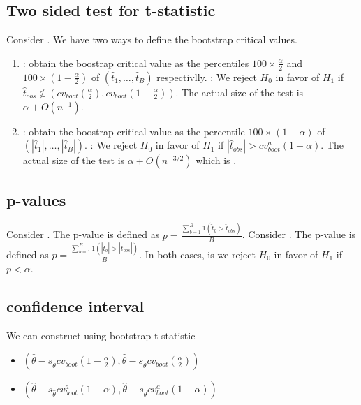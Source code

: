 \subsection{Two sided test for t-statistic}

Consider . We have two ways to define the bootstrap critical values.
\begin{enumerate}
    \item {}: obtain the boostrap critical value  as the percentiles
    $100 \times \frac{\alpha}{2}$ and $100\times(1-\frac{\alpha}{2})$ of $(\hat{t}_1,\ldots,\hat{t}_B)$ respectivlly. 
    : We reject $H_0$ in favor of $H_1$ if $\hat{t}_{obs}\notin (cv_{boot}(\frac{\alpha}{2}),cv_{boot}(1-\frac{\alpha}{2}))$.
    The actual size of the test is $\alpha+O(n^{-1})$. 
    \item {}: obtain the boostrap critical value  as the percentile $100 \times (1-\alpha)$ of $(|\hat{t}_1|,\ldots,|\hat{t}_B|)$.
    : We reject $H_0$ in favor of $H_1$ if $|\hat{t}_{obs}|>cv^a_{boot}(1-\alpha)$.
    The actual size of the test is $\alpha+O(n^{-3/2})$ which is .
\end{enumerate}

\subsection{p-values}

Consider . The p-value is defined as $p = \frac{\sum_{b=1}^{B}1(\hat{t}_b>\hat{t}_{obs})}{B}$.
Consider . The p-value is defined as $p = \frac{\sum_{b=1}^{B}1(|\hat{t}_b|>|\hat{t}_{obs}|)}{B}$.
In both cases,  is we reject $H_0$ in favor of $H_1$ if $p < \alpha$.

\subsection{confidence interval}

We can construct  using bootstrap t-statistic
\begin{itemize}
    \item $(\hat{\theta}-s_{\hat{\theta}}cv_{boot}(1-\frac{\alpha}{2}),\hat{\theta}-s_{\hat{\theta}}cv_{boot}(\frac{\alpha}{2}))$
    \item $(\hat{\theta}-s_{\hat{\theta}}cv_{boot}^a(1-\alpha),\hat{\theta}+s_{\hat{\theta}}cv_{boot}^a(1-\alpha))$ 
\end{itemize}

